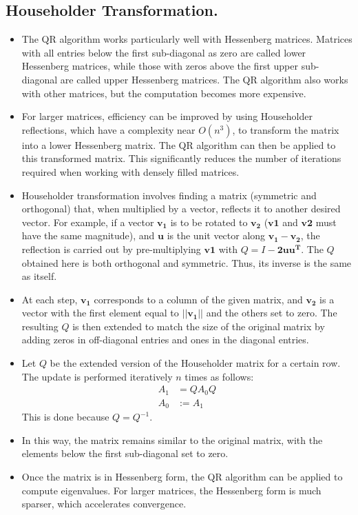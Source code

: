 \documentclass[12pt,letterpaper, onecolumn]{exam}
\begin{document}
\subsection{Householder Transformation.}
\begin{itemize}
    \item The QR algorithm works particularly well with Hessenberg matrices. Matrices with all entries below the first sub-diagonal as zero are called lower Hessenberg matrices, while those with zeros above the first upper sub-diagonal are called upper Hessenberg matrices. The QR algorithm also works with other matrices, but the computation becomes more expensive.
    \item For larger matrices, efficiency can be improved by using Householder reflections, which have a complexity near $O(n^3)$, to transform the matrix into a lower Hessenberg matrix. The QR algorithm can then be applied to this transformed matrix. This significantly reduces the number of iterations required when working with densely filled matrices.
    \item Householder transformation involves finding a matrix (symmetric and orthogonal) that, when multiplied by a vector, reflects it to another desired vector. For example, if a vector $\mathbf{v_1}$ is to be rotated to $\mathbf{v_2}$ ($\mathbf{v1}$ and $\mathbf{v2}$ must have the same magnitude), and $\mathbf{u}$ is the unit vector along $\mathbf{{v_1} - {v_2}}$, the reflection is carried out by pre-multiplying $\mathbf{v1}$ with $ Q = I - \mathbf{2uu^{T}}$.
        The $Q$ obtained here is both orthogonal and symmetric. Thus, its inverse is the same as itself.
    \item At each step, $\mathbf{v_1}$ corresponds to a column of the given matrix, and $\mathbf{v_2}$ is a vector with the first element equal to $||\mathbf{v_1}||$ and the others set to zero. The resulting $Q$ is then extended to match the size of the original matrix by adding zeros in off-diagonal entries and ones in the diagonal entries.
    \item Let $Q$ be the extended version of the Householder matrix for a certain row. The update is performed iteratively $n$ times as follows:
    \begin{align*}
        A_1 &= QA_0Q \\
        A_0 &:= A_1
    \end{align*}
    This is done because $Q = Q^{-1}$.
    \item In this way, the matrix remains similar to the original matrix, with the elements below the first sub-diagonal set to zero.
    \item Once the matrix is in Hessenberg form, the QR algorithm can be applied to compute eigenvalues. For larger matrices, the Hessenberg form is much sparser, which accelerates convergence.
\end{itemize}
\end{document}
